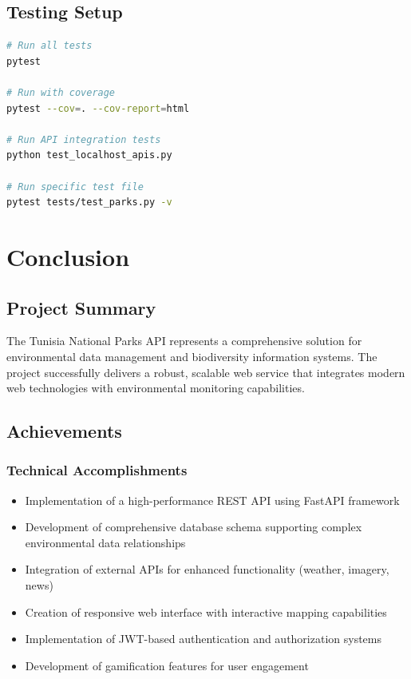 \documentclass[12pt,a4paper]{report}
\begin{document}
\section{Testing Setup}

\begin{lstlisting}[language=bash, caption=Testing Configuration]
# Run all tests
pytest

# Run with coverage
pytest --cov=. --cov-report=html

# Run API integration tests
python test_localhost_apis.py

# Run specific test file
pytest tests/test_parks.py -v
\end{lstlisting}

\chapter{Conclusion}

\section{Project Summary}

The Tunisia National Parks API represents a comprehensive solution for environmental data management and biodiversity information systems. The project successfully delivers a robust, scalable web service that integrates modern web technologies with environmental monitoring capabilities.

\section{Achievements}

\subsection{Technical Accomplishments}
\begin{itemize}
    \item Implementation of a high-performance REST API using FastAPI framework
    \item Development of comprehensive database schema supporting complex environmental data relationships
    \item Integration of external APIs for enhanced functionality (weather, imagery, news)
    \item Creation of responsive web interface with interactive mapping capabilities
    \item Implementation of JWT-based authentication and authorization systems
    \item Development of gamification features for user engagement
\end{itemize}
\end{document}
